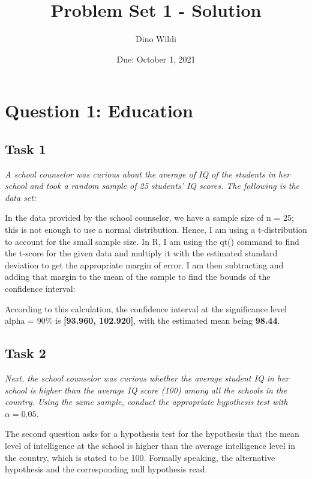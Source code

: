\documentclass[12pt,a4paper]{article}
\title{Problem Set 1 - Solution}
\date{Due: October 1, 2021}
\author{Dino Wildi}
\begin{document}
\maketitle

\section{Question 1: Education}

\subsection{Task 1}
\textit{A school counselor was curious about the average of IQ of the students in her school and took a random sample of 25 students' IQ scores. The following is the data set:\\}
\vspace{.5cm}
  
\vspace{0.5cm}

In the data provided by the school counselor, we have a sample size of n = 25; this is not enough to use a normal distribution. Hence, I am using a t-distribution to account for the small sample size. In R, I am using the qt() command to find the t-score for the given data and multiply it with the estimated standard deviation to get the appropriate margin of error. I am then subtracting and adding that margin to the mean of the sample to find the bounds of the confidence interval:



According to this calculation, the confidence interval at the significance level alpha = 90\% is \textbf{[93.960, 102.920]}, with the estimated mean being \textbf{98.44}.

\subsection{Task 2}
\textit{Next, the school counselor was curious  whether  the average student IQ in her school is higher than the average IQ score (100) among all the schools in the country. Using the same sample, conduct the appropriate hypothesis test with $\alpha=0.05$.}
\vspace{0.5cm}

The second question asks for a hypothesis test for the hypothesis that the mean level of intelligence at the school is higher than the average intelligence level in the country, which is stated to be 100. Formally speaking, the alternative hypothesis and the corresponding null hypothesis read:
\end{document}
